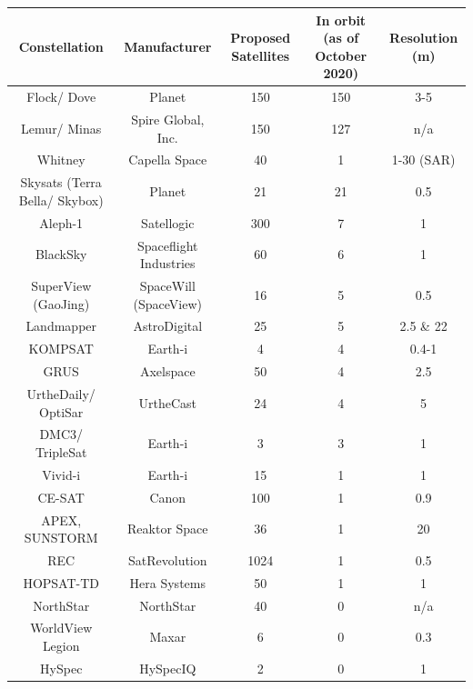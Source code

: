 \bigskip
\begin{center}
\vspace{3mm}
\begin{adjustbox}{width=0.9\textwidth}
\begin{tabular}{||c| c |c |c |c||}
\hline
\textbf{Constellation} & \textbf{Manufacturer} & \textbf{Proposed Satellites} & \textbf{In orbit} (as of October 2020) & \textbf{Resolution (m)}\\
\hline \hline
Flock/ Dove & Planet & 150 & 150 & 3-5\\%
Lemur/ Minas & Spire Global, Inc. & 150 & 127 & n/a\\
Whitney & Capella Space & 40 & 1 & 1-30 (SAR)\\
Skysats (Terra Bella/ Skybox) & Planet & 21 & 21 & 0.5\\
Aleph-1 & Satellogic & 300 & 7 & 1\\ %
BlackSky & Spaceflight Industries & 60 & 6 & 1\\%
SuperView (GaoJing) & SpaceWill (SpaceView) & 16 & 5 & 0.5\\%
Landmapper & AstroDigital & 25 & 5 & 2.5 \& 22\\
KOMPSAT & Earth-i & 4 & 4 & 0.4-1\\
GRUS & Axelspace & 50 & 4 & 2.5\\
UrtheDaily/ OptiSar & UrtheCast & 24 & 4 & 5\\
DMC3/ TripleSat & Earth-i & 3 & 3 & 1\\
Vivid-i & Earth-i & 15 & 1 & 1\\
CE-SAT & Canon & 100 & 1 & 0.9\\%
APEX, SUNSTORM & Reaktor Space & 36 & 1 & 20\\%
REC & SatRevolution & 1024 & 1 & 0.5\\
HOPSAT-TD & Hera Systems & 50 & 1 & 1\\
NorthStar & NorthStar & 40 & 0 & n/a\\%
WorldView Legion & Maxar & 6 & 0 & 0.3\\%
HySpec & HySpecIQ & 2 & 0 & 1\\ %




\end{tabular}
\end{adjustbox}
\end{center}
